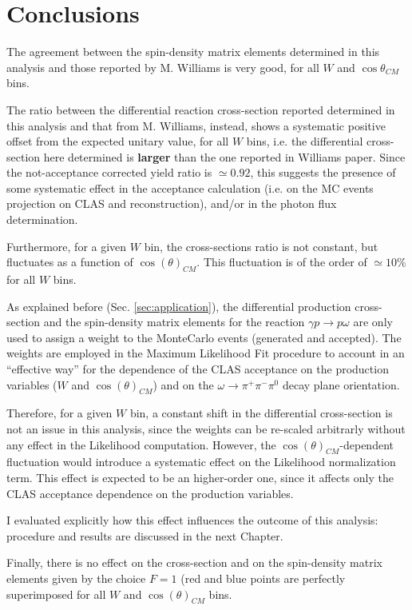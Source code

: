 \documentclass[a4paper,10pt]{report}
\newcommand{\decay}{$\omega \rightarrow \pi^+ \pi^- \pi^0$ }
\newcommand{\production}{$\gamma p \rightarrow p \omega$ }
\begin{document}
\section{Conclusions}

The agreement between the spin-density matrix elements determined in this analysis and those reported by M. Williams is very good, for all $W$ and $\cos{\theta}_{CM}$ bins.  

The ratio between the differential reaction cross-section reported determined in this analysis and that from M. Williams, instead, shows a systematic positive offset from the expected unitary value, for all $W$ bins, i.e. the differential cross-section here determined is \textbf{larger} than the one reported in Williams paper.
Since the not-acceptance corrected yield ratio is $\simeq 0.92$, this suggests the presence of some systematic effect in the acceptance calculation (i.e. on the MC events projection on CLAS and reconstruction), and/or in the photon flux determination. 

Furthermore, for a given $W$ bin, the cross-sections ratio is not constant, but fluctuates as a function of $\cos(\theta)_{CM}$. This fluctuation is of the order of $\simeq 10\%$ for all $W$ bins.

As explained before (Sec. \ref{sec:application}), the differential production cross-section and the spin-density matrix elements for the reaction \production are only used to assign a weight to the MonteCarlo events (generated and accepted).
The weights are employed in the Maximum Likelihood Fit procedure to account in an ``effective way'' for the dependence of the CLAS acceptance on the production variables ($W$ and $\cos(\theta)_{CM}$) and on the \decay decay plane orientation. 

Therefore, for a given $W$ bin, a constant shift in the differential cross-section is not an issue in this analysis, since the weights can be re-scaled arbitrarly without any effect in the Likelihood computation. However, the $\cos(\theta)_{CM}$-dependent fluctuation would introduce a systematic effect on the Likelihood normalization term. This effect is expected to be an higher-order one, since it affects only the CLAS acceptance dependence on the production variables.

I evaluated explicitly how this effect influences the outcome of this analysis: procedure and results are discussed in the next Chapter.

Finally, there is no effect on the cross-section and on the spin-density matrix elements given by the choice $F=1$ (red and blue points are perfectly superimposed for all $W$ and $\cos(\theta)_{CM}$ bins.
\end{document}
